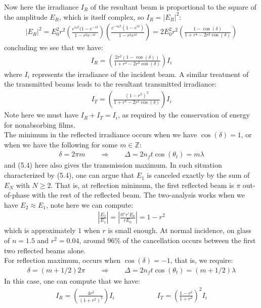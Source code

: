 \documentclass[11pt]{book}
\theoremstyle{break}
\theoremstyle{break}
\newcommand{\Z}{\mathbb{Z}}
\begin{document}
Now here the irradiance $I_R$ of the resultant beam is proportional to the square of the amplitude $E_R$, which is itself complex, so $I_R = |E_R|^2$:
\begin{align*}
|E_R|^2 = E_0^2 r^2 \left(\frac{e^{i\omega t}(1-e^{-i\delta}}{1-r^2 e^{-i\delta}} \right)\left( \frac{e^{-i\omega t}(1-e^{i\delta})}{1-r^2 e^{i\delta}}\right)= 2E_0^2r^2 \left( \frac{1-\cos(\delta)}{1+r^4-2r^2 \cos(\delta)}\right)
\end{align*}
concluding we see that we have:
\begin{align*}
I_R = \left( \frac{2r^2 (1-\cos(\delta))}{1+r^4 - 2r^2 \cos(\delta)}\right) I_i
\end{align*}
where $I_i$ represents the irradiance of the incident beam. A similar treatment of the transmitted beams leads to the resultant transmitted irradiance:
\begin{align*}
I_T = \left( \frac{(1-r^2)^2}{1+r^4 - 2r^2 \cos(\delta)}\right)I_i
\end{align*}
Note here we must have $I_R + I_T = I_i$, as required by the conservation of energy for nonabsorbing films.\\

The minimum in the reflected irradiance occurs when we have $\cos(\delta) = 1$, or when we have the following for some $m\in \Z$:
\begin{align}
\delta = 2\pi m \qquad \Rightarrow\qquad \Delta = 2n_f t\cos(\theta_t) = m\lambda
\end{align}
and (5.4) here also gives the transmission maximum. In such situation characterized by (5.4), one can argue that $E_1$ is canceled exactly by the sum of $E_N$ with $N \geq 2$. That is, at reflection minimum, the first reflected beam is $\pi$ out-of-phase with the rest of the reflected beam. The two-analysis works when we have $E_2 \approx E_1$, note here we can compute:
\begin{align*}
\left|\frac{E_2}{E_1}\right| = \left|\frac{tt'r'E_0}{rE_0}\right| = 1-r^2
\end{align*}
which is approximately $1$ when $r$ is small enough. At normal incidence, on glass of $n=1.5$ and $r^2 = 0.04$, around $96\%$ of the cancellation occurs between the first two reflected beams alone. \\

For reflection maximum, occurs when $\cos(\delta) = -1$, that is, we require:
\begin{align*}
\delta = (m+1/2)2\pi \qquad \Rightarrow \qquad \Delta = 2n_f t \cos(\theta_t) = (m+1/2) \lambda
\end{align*}
In this case, one can compute that we have:
\begin{align*}
I_R = \left( \frac{4r^2}{(1+r^2)^2}\right)I_i \qquad\qquad \qquad I_T = \left( \frac{1-r^2}{1+r^2}\right)^2 I_i
\end{align*}
\end{document}

